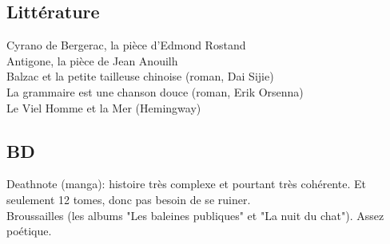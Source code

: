 \subsection{Littérature}
Cyrano de Bergerac, la pièce d'Edmond Rostand\\
Antigone, la pièce de Jean Anouilh\\
Balzac et la petite tailleuse chinoise (roman, Dai Sijie)\\
La grammaire est une chanson douce (roman, Erik Orsenna)\\
Le Viel Homme et la Mer (Hemingway)\\

\subsection{BD}
Deathnote (manga): histoire très complexe et pourtant très cohérente. Et seulement 12 tomes, donc pas besoin de se ruiner.\\
Broussailles (les albums "Les baleines publiques" et "La nuit du chat"). Assez poétique.\\






